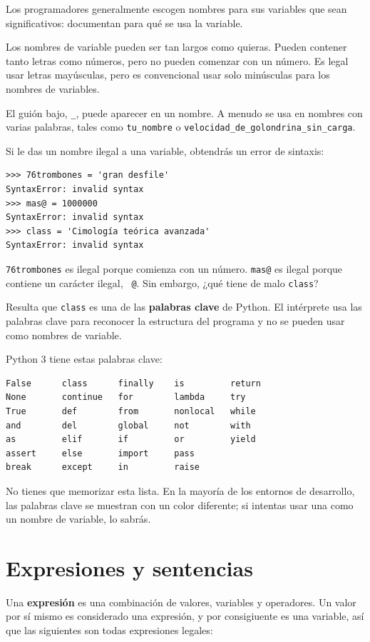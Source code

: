 \documentclass[10pt]{book}
\begin{document}
Los programadores generalmente escogen nombres para sus variables que
sean significativos: documentan para qué se usa la variable.

Los nombres de variable pueden ser tan largos como quieras.  Pueden contener
tanto letras como números, pero no pueden comenzar con un número.
Es legal usar letras mayúsculas, pero es convencional
usar solo minúsculas para los nombres de variables.

El guión bajo, \verb"_", puede aparecer en un nombre.
A menudo se usa en nombres con varias palabras, tales como
\verb"tu_nombre" o \verb"velocidad_de_golondrina_sin_carga".

Si le das un nombre ilegal a una variable, obtendrás un error de sintaxis:

\begin{verbatim}
>>> 76trombones = 'gran desfile'
SyntaxError: invalid syntax
>>> mas@ = 1000000
SyntaxError: invalid syntax
>>> class = 'Cimología teórica avanzada'
SyntaxError: invalid syntax
\end{verbatim}
%
{\tt 76trombones} es ilegal porque comienza con un número.
{\tt mas@} es ilegal porque contiene un carácter ilegal, {\tt
@}.  Sin embargo, ¿qué tiene de malo {\tt class}?

Resulta que {\tt class} es una de las {\bf palabras clave} de Python.  El
intérprete usa las palabras clave para reconocer la estructura del programa
y no se pueden usar como nombres de variable.

Python 3 tiene estas palabras clave:

\begin{verbatim}
False      class      finally    is         return
None       continue   for        lambda     try
True       def        from       nonlocal   while
and        del        global     not        with
as         elif       if         or         yield
assert     else       import     pass
break      except     in         raise
\end{verbatim}
%
No tienes que memorizar esta lista.  En la mayoría de los entornos de desarrollo,
las palabras clave se muestran con un color diferente; si intentas usar una
como un nombre de variable, lo sabrás.


\section{Expresiones y sentencias}

Una {\bf expresión} es una combinación de valores, variables y operadores.
Un valor por sí mismo es considerado una expresión, y por consigiuente es
una variable, así que las siguientes son todas expresiones legales:
\end{document}
